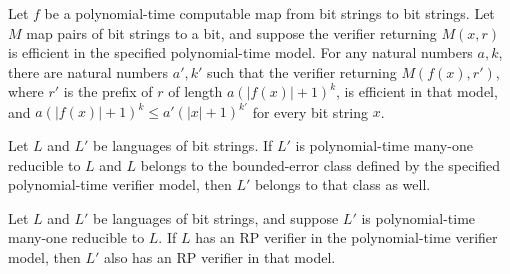 \begin{theorem}
\label{Randomized.exists_eff_reducedVerifier}
\leanok
{}
Let $f$ be a polynomial-time computable map from bit strings to bit strings. Let $M$ map
pairs of bit strings to a bit, and suppose the verifier returning $M(x,r)$ is efficient
in the specified polynomial-time model. For any natural numbers $a,k$, there are natural
numbers $a',k'$ such that the verifier returning $M(f(x),r')$, where $r'$ is the prefix
of $r$ of length $a(|f(x)|+1)^k$, is efficient in that model, and $a(|f(x)|+1)^k\le
a'(|x|+1)^{k'}$ for every bit string $x$.
\end{theorem}

\begin{theorem}
\label{Randomized.InBPP.of_polyTimeReducible}
\leanok
{}
Let $L$ and $L'$ be languages of bit strings. If $L'$ is polynomial-time many-one
reducible to $L$ and $L$ belongs to the bounded-error class defined by the specified
polynomial-time verifier model, then $L'$ belongs to that class as well.
\end{theorem}

\begin{theorem}
\label{Randomized.InRP.of_polyTimeReducible}
\leanok
{}
Let $L$ and $L'$ be languages of bit strings, and suppose $L'$ is polynomial-time
many-one reducible to $L$. If $L$ has an RP verifier in the polynomial-time verifier
model, then $L'$ also has an RP verifier in that model.
\end{theorem}

